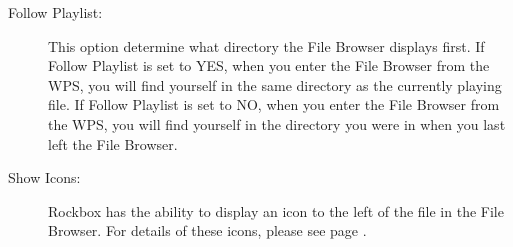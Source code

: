 \begin{description}
  \item[Follow Playlist:]
    This option determine what directory the File Browser displays first.  
    If Follow Playlist is set to YES, when you enter the File Browser from 
    the WPS, you will find yourself in the same directory as the currently 
    playing file.  If Follow Playlist is set to NO, when you enter the File 
    Browser from the WPS, you will find yourself in the directory you were 
    in when you last left the File Browser.
    
  \item[Show Icons:]
    Rockbox has the ability to display an icon to the left of the file 
    in the File Browser.  For details of these icons, please see page 
    \pageref{ref:Supportedfileformats}.
  \end{description}
